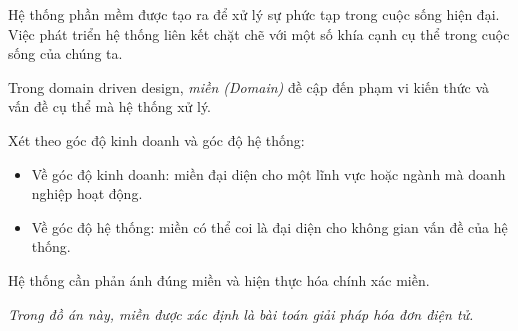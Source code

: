 Hệ thống phần mềm được tạo ra để xử lý sự phức tạp trong cuộc sống hiện đại. Việc phát triển hệ thống liên kết chặt chẽ với một số khía cạnh cụ thể trong cuộc sống của chúng ta.

Trong domain driven design, \emph{miền (Domain)} đề cập đến phạm vi kiến thức và vấn đề cụ thể mà hệ thống xử lý.

Xét theo góc độ kinh doanh và góc độ hệ thống:

\begin{itemize}

\item Về góc độ kinh doanh: miền đại diện cho một lĩnh vực hoặc ngành mà doanh nghiệp hoạt động.

\item Về góc độ hệ thống: miền có thể coi là đại diện cho không gian vấn đề của hệ thống.

\end{itemize}

Hệ thống cần phản ánh đúng miền và hiện thực hóa chính xác miền.

\begin{example} \emph{Trong đồ án này, miền được xác định là bài toán giải pháp hóa đơn điện tử.}

\end{example}